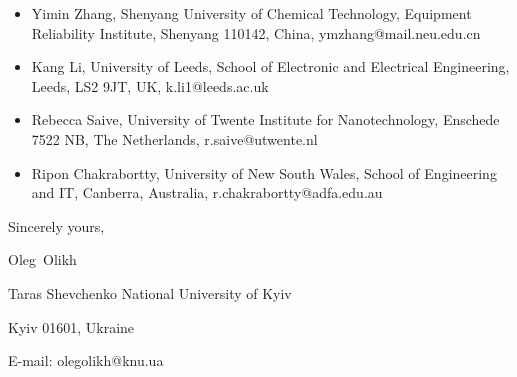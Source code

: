 \documentclass[preprint]{elsarticle}
\begin{document}
\begin{itemize}
  \item Yimin Zhang,
Shenyang University of Chemical Technology,
Equipment Reliability Institute, Shenyang 110142, China,
ymzhang@mail.neu.edu.cn
  \item Kang Li,
University of Leeds,
School of Electronic and Electrical Engineering,  Leeds, LS2 9JT, UK,
k.li1@leeds.ac.uk
  \item Rebecca Saive,
University of Twente Institute for Nanotechnology, Enschede 7522 NB, The Netherlands,
r.saive@utwente.nl
  \item Ripon Chakrabortty,
University of New South Wales,
School of Engineering and IT, Canberra, Australia,
r.chakrabortty@adfa.edu.au
\end{itemize}


\vspace{3mm}

Sincerely yours,

Oleg~Olikh


Taras Shevchenko National University of Kyiv


Kyiv 01601, Ukraine

E-mail: olegolikh@knu.ua


\end{document}
